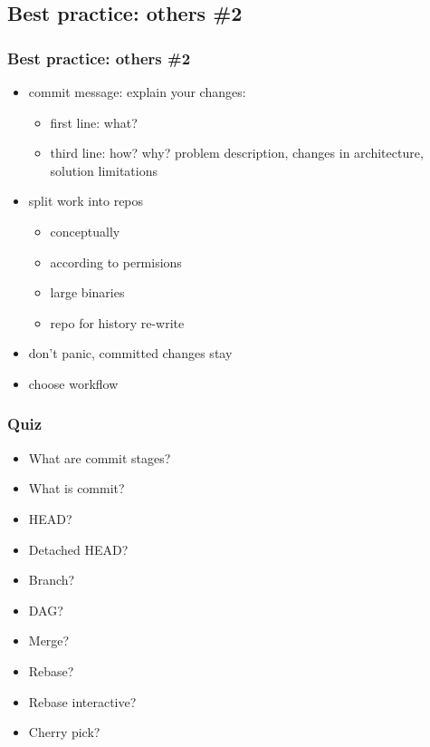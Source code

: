 \documentclass{beamer}
\begin{document}
	\subsection{Best practice: others \#2}
		\begin{frame}
			\frametitle{Best practice: others \#2}
			\begin{itemize}
                \item commit message: explain your changes:
			    \begin{itemize}
                    \item first line: what? 
                    \item third line: how? why? problem description, changes in architecture, solution limitations
                \end{itemize}
                \item split work into repos
			    \begin{itemize}
                    \item conceptually
                    \item according to permisions
                    \item large binaries
                    \item repo for history re-write
                \end{itemize}
                \item don't panic, committed changes stay
                \item choose workflow
			\end{itemize}
		\end{frame}
		
		\begin{frame}
			\frametitle{Quiz}
			\begin{itemize}
                \item What are commit stages?
                \item What is commit?
                \item HEAD?
                \item Detached HEAD?
                \item Branch?
                \item DAG?
                \item Merge?
                \item Rebase?
                \item Rebase interactive?
                \item Cherry pick?
			\end{itemize}
		\end{frame}
		
\end{document}
